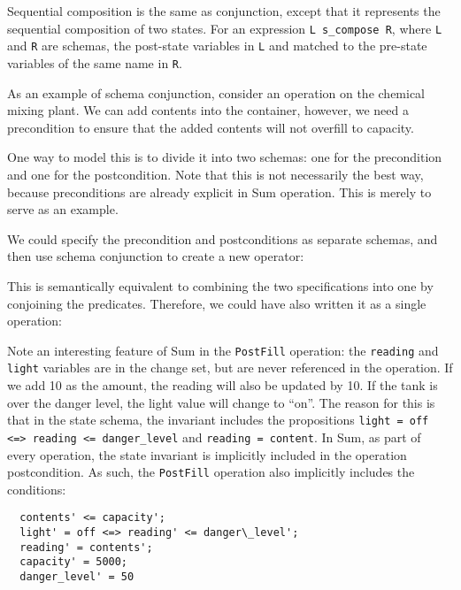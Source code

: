 Sequential composition is the same as conjunction, except that it represents the sequential composition of two states. For an expression \texttt{L s\_compose R}, where \texttt{L} and \texttt{R} are schemas, the post-state variables in \texttt{L} and matched to the pre-state variables of the same name in \texttt{R}.


\begin{example}
As an example of schema conjunction, consider an operation on the chemical mixing plant. We can add contents into the container, however, we need a precondition to ensure that the added contents will not overfill to capacity. 

One way to model this is to divide it into two schemas: one for the precondition and one for the postcondition. Note that this is not necessarily the best way, because preconditions are already explicit in Sum operation. This is merely to serve as an example.

We could specify the precondition and postconditions as separate schemas, and then use schema conjunction to create a new operator:



This is semantically equivalent to combining the two specifications into one by conjoining the predicates. Therefore, we could have also written it as a single operation:



Note an interesting feature of Sum in the \texttt{PostFill} operation: the \texttt{reading} and \texttt{light} variables are in the change set, but are never referenced in the operation. If we add 10 as the amount, the reading will also be updated by 10. If the tank is over the danger level, the light value will change to ``on''. The reason for this is that in the state schema, the invariant includes the propositions \texttt{light = off <=> reading <= danger\_level} and \texttt{reading = content}. In Sum, as part of every operation, the state invariant is implicitly included in the operation postcondition. As such, the \texttt{PostFill} operation also implicitly includes the conditions:

\begin{verbatim}
  contents' <= capacity';
  light' = off <=> reading' <= danger\_level';
  reading' = contents';
  capacity' = 5000;
  danger_level' = 50
\end{verbatim}

\end{example}

